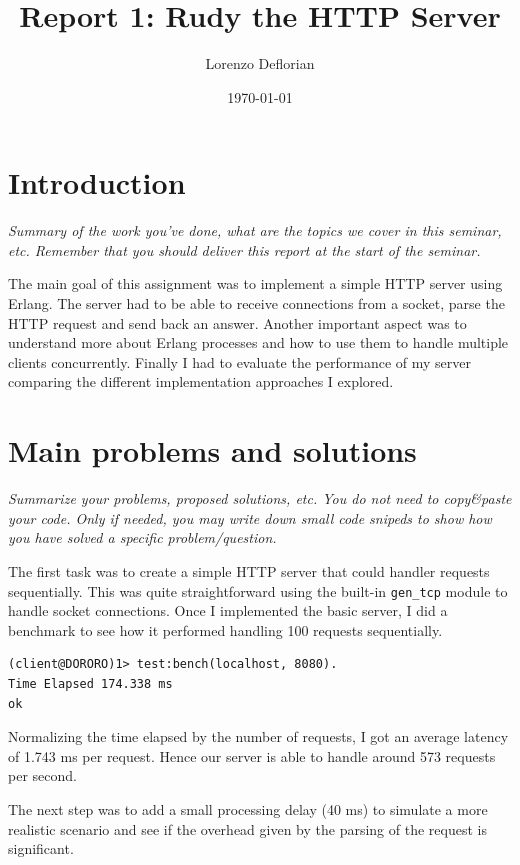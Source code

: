 \documentclass[a4paper, 11pt]{article}
\title{Report 1: Rudy the HTTP Server}
\author{Lorenzo Deflorian}
\date{\today{}}
\begin{document}
\maketitle

\section{Introduction}

\textit{Summary of the work you've done, what are the topics we cover
  in this seminar, etc. Remember that you should deliver this report
  at the start of the seminar.}

The main goal of this assignment was to implement a simple HTTP server using Erlang. 
The server had to be able to receive connections from a socket, parse the HTTP request and send back an answer.
Another important aspect was to understand more about Erlang processes and how to use them to handle multiple clients concurrently.
Finally I had to evaluate the performance of my server comparing the different implementation approaches I explored.


\section{Main problems and solutions}

\textit{Summarize your problems, proposed solutions, etc. You do not
  need to copy\&paste your code. Only if needed, you may write down
  small code snipeds to show how you have solved a specific
  problem/question.}

The first task was to create a simple HTTP server that could handler requests sequentially.
This was quite straightforward using the built-in \texttt{gen\_tcp} module to handle socket connections. Once I implemented the basic server, I did a benchmark to see how it performed handling 100 requests sequentially.

\begin{lstlisting}[style=erlang, caption={Benchmarking the sequential server}]
(client@DORORO)1> test:bench(localhost, 8080).
Time Elapsed 174.338 ms
ok
\end{lstlisting}

Normalizing the time elapsed by the number of requests, I got an average latency of 1.743 ms per request. Hence our server is able to handle around 573 requests per second.

The next step was to add a small processing delay (40 ms) to simulate a more realistic scenario and see if the overhead given by the parsing of the request is significant.
\end{document}
